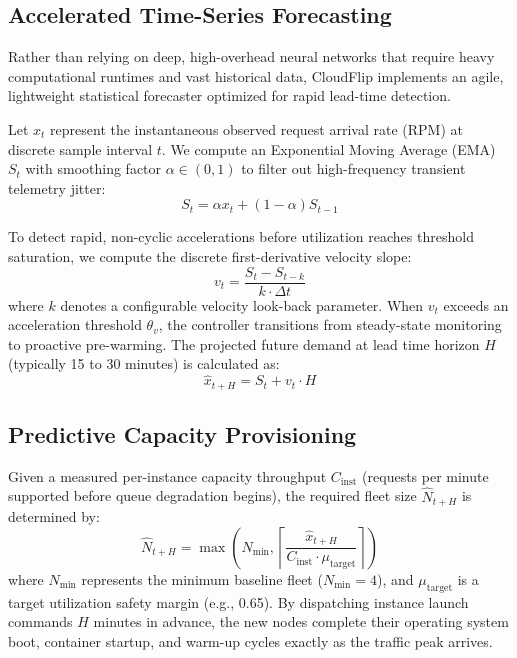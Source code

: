 \documentclass[sigconf,nonacm]{acmart}
\begin{document}
\subsection{Accelerated Time-Series Forecasting}
Rather than relying on deep, high-overhead neural networks that require heavy computational runtimes and vast historical data, CloudFlip implements an agile, lightweight statistical forecaster optimized for rapid lead-time detection.

Let $x_t$ represent the instantaneous observed request arrival rate (RPM) at discrete sample interval $t$. We compute an Exponential Moving Average (EMA) $S_t$ with smoothing factor $\alpha \in (0, 1)$ to filter out high-frequency transient telemetry jitter:
\begin{equation}
S_t = \alpha x_t + (1 - \alpha) S_{t-1}
\end{equation}

To detect rapid, non-cyclic accelerations before utilization reaches threshold saturation, we compute the discrete first-derivative velocity slope:
\begin{equation}
v_t = \frac{S_t - S_{t-k}}{k \cdot \Delta t}
\end{equation}
where $k$ denotes a configurable velocity look-back parameter. When $v_t$ exceeds an acceleration threshold $\theta_v$, the controller transitions from steady-state monitoring to proactive pre-warming. The projected future demand at lead time horizon $H$ (typically 15 to 30 minutes) is calculated as:
\begin{equation}
\hat{x}_{t+H} = S_t + v_t \cdot H
\end{equation}

\subsection{Predictive Capacity Provisioning}
Given a measured per-instance capacity throughput $C_{\text{inst}}$ (requests per minute supported before queue degradation begins), the required fleet size $\hat{N}_{t+H}$ is determined by:
\begin{equation}
\hat{N}_{t+H} = \max\left( N_{\min}, \left\lceil \frac{\hat{x}_{t+H}}{C_{\text{inst}} \cdot \mu_{\text{target}}} \right\rceil \right)
\end{equation}
where $N_{\min}$ represents the minimum baseline fleet ($N_{\min}=4$), and $\mu_{\text{target}}$ is a target utilization safety margin (e.g., 0.65). By dispatching instance launch commands $H$ minutes in advance, the new nodes complete their operating system boot, container startup, and warm-up cycles exactly as the traffic peak arrives.
\end{document}
